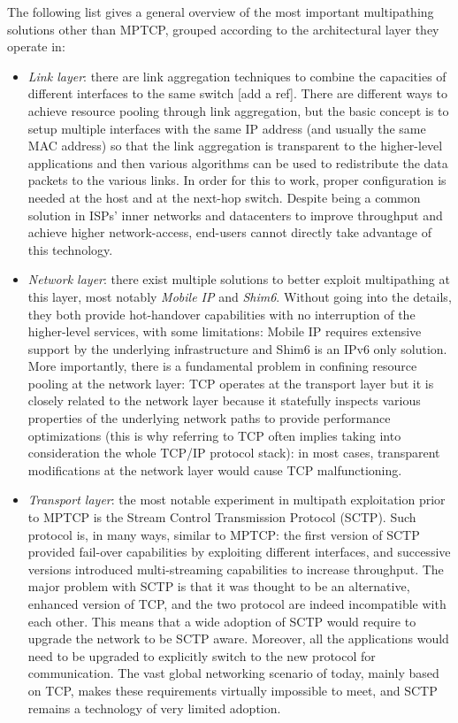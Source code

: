 The following list gives a general overview of the most important multipathing solutions other than MPTCP, grouped according to the architectural layer they operate in:
\begin{itemize}
  \item \textit{Link layer}: there are link aggregation techniques to combine the capacities of different interfaces to the same switch [add a ref]. There are different ways to achieve resource pooling through link aggregation, but the basic concept is to setup multiple interfaces with the same IP address (and usually the same MAC address) so that the link aggregation is transparent to the higher-level applications and then various algorithms can be used to redistribute the data packets to the various links. In order for this to work, proper configuration is needed at the host and at the next-hop switch. Despite being a common solution in ISPs' inner networks and datacenters to improve throughput and achieve higher network-access, end-users cannot directly take advantage of this technology.


  \item \textit{Network layer}: there exist multiple solutions to better exploit multipathing at this layer, most notably \textit{Mobile IP} and \textit{Shim6}. Without going into the details, they both provide hot-handover capabilities with no interruption of the higher-level services, with some limitations: Mobile IP requires extensive support by the underlying infrastructure and Shim6 is an IPv6 only solution. More importantly, there is a fundamental problem in confining resource pooling at the network layer: TCP operates at the transport layer but it is closely related to the network layer because it statefully inspects various properties of the underlying network paths to provide performance optimizations (this is why referring to TCP often implies taking into consideration the whole TCP/IP protocol stack): in most cases, transparent modifications at the network layer would cause TCP malfunctioning.


  \item \textit{Transport layer}: the most notable experiment in multipath exploitation prior to MPTCP is the Stream Control Transmission Protocol (SCTP). Such protocol is, in many ways, similar to MPTCP: the first version of SCTP provided fail-over capabilities by exploiting different interfaces, and successive versions introduced multi-streaming capabilities to increase throughput. The major problem with SCTP is that it was thought to be an alternative, enhanced version of TCP, and the two protocol are indeed incompatible with each other. This means that a wide adoption of SCTP would require to upgrade the network to be SCTP aware. Moreover, all the applications would need to be upgraded to explicitly switch to the new protocol for communication. The vast global networking scenario of today, mainly based on TCP, makes these requirements virtually impossible to meet, and SCTP remains a technology of very limited adoption.
\end{itemize}


